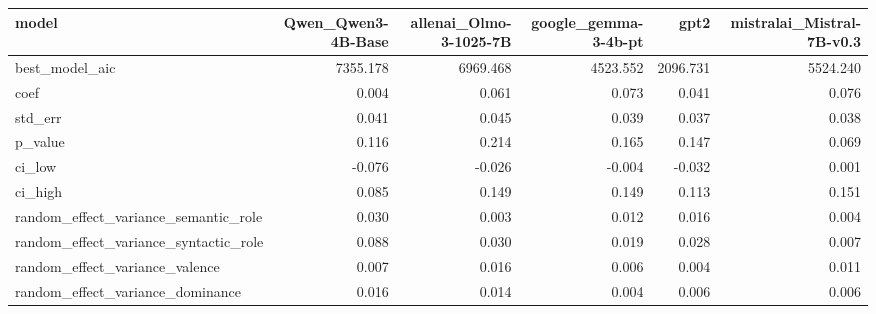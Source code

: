 \begin{tabular}{lrrrrr}
\toprule
model & Qwen_Qwen3-4B-Base & allenai_Olmo-3-1025-7B & google_gemma-3-4b-pt & gpt2 & mistralai_Mistral-7B-v0.3 \\
\midrule
best_model_aic & 7355.178 & 6969.468 & 4523.552 & 2096.731 & 5524.240 \\
coef & 0.004 & 0.061 & 0.073 & 0.041 & 0.076 \\
std_err & 0.041 & 0.045 & 0.039 & 0.037 & 0.038 \\
p_value & 0.116 & 0.214 & 0.165 & 0.147 & 0.069 \\
ci_low & -0.076 & -0.026 & -0.004 & -0.032 & 0.001 \\
ci_high & 0.085 & 0.149 & 0.149 & 0.113 & 0.151 \\
random_effect_variance_semantic_role & 0.030 & 0.003 & 0.012 & 0.016 & 0.004 \\
random_effect_variance_syntactic_role & 0.088 & 0.030 & 0.019 & 0.028 & 0.007 \\
random_effect_variance_valence & 0.007 & 0.016 & 0.006 & 0.004 & 0.011 \\
random_effect_variance_dominance & 0.016 & 0.014 & 0.004 & 0.006 & 0.006 \\
\bottomrule
\end{tabular}
